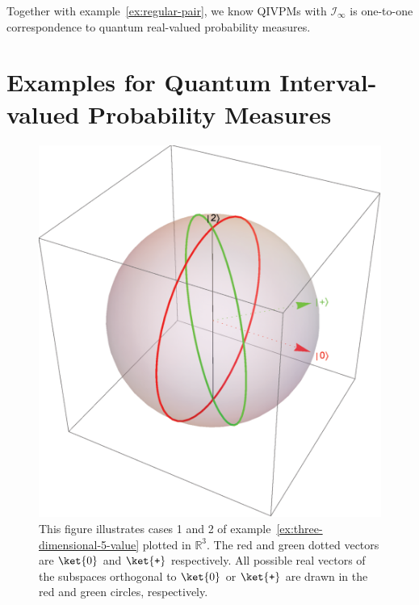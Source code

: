 \documentclass[12pt]{iopart}
\theoremstyle{plain}
\theoremstyle{definition}
\theoremstyle{remark}
\newcommand{\ps}{\texttt{+}}
\begin{document}
Together with example~\ref{ex:regular-pair}, we know QIVPMs with
$\mathscr{I}_{\infty}$ is one-to-one correspondence to quantum real-valued
probability measures.



\section{Examples for Quantum Interval-valued Probability Measures\label{sec:Examples-for-QuantumIVPM}}

\begin{figure}
\begin{centering}
\includegraphics[scale=0.38]{figureE1} 
\par\end{centering}
\caption{\label{fig:three-dimensional-5-value}This figure illustrates cases
1 and 2 of example~\ref{ex:three-dimensional-5-value} plotted in
$\mathbb{R}^{3}$. The red and green dotted vectors are $\ket{0}$
and $\ket{\ps}$ respectively. All possible real vectors of the subspaces
orthogonal to $\ket{0}$ or $\ket{\ps}$ are drawn in the red and
green circles, respectively.}
\end{figure}
\end{document}
